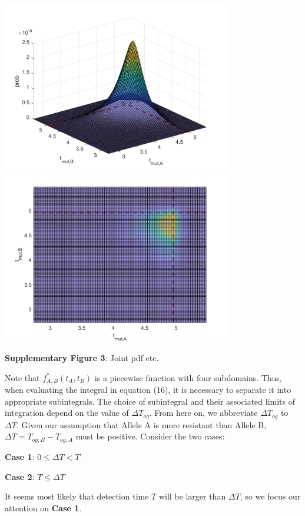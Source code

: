 \documentclass{article}
\begin{document}
\begin{center}
\includegraphics[width=0.75\textwidth]{JointPDF1}
\includegraphics[width=0.75\textwidth]{JointPDF2}

\textbf{Supplementary Figure 3}: Joint pdf etc.
\end{center}

Note that $f_{A,B}^*(t_{A},t_{B})$ is a piecewise function with four subdomains.  Thus, when evaluating the integral in equation (16), it is necessary to separate it into appropriate subintegrals.  The choice of subintegral and their associated limits of integration depend on the value of $\Delta T_{og}$.  From here on, we abbreviate $\Delta T_{og}$ to $\Delta T$.  Given our assumption that Allele A is more resistant than Allele B, $\Delta T = T_{og,B} - T_{og,A}$ must be positive. Consider the two cases:
\begin{description}
\item{\textbf{Case 1}: $0 \leq \Delta T < T$}
\item{\textbf{Case 2}: $T \leq \Delta T$}
\end{description}
It seems most likely that detection time $T$ will be larger than $\Delta T$, so we focus our attention on \textbf{Case 1}.
\end{document}
